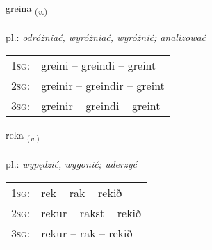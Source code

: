 \documentclass[frontgrid, backgrid]{flacards}\usepackage[]{graphicx}\usepackage[]{xcolor}
\begin{document}
\renewcommand{\blhead}{\vskip5pt {\small\bfseries\footnotesize Sagnorð | czasownik }}
\renewcommand{\bcfoot}{\vskip5pt \hspace{2pt}{\small\bfseries\footnotesize 1K}}


{greina \small{\textsubscript{(\textit{v.})}} \\[1ex] %
\textphonetic{[kreiːna]} \\
pl.: \emph{odróżniać, wyróżniać, wyróżnić; analizować} \\  [2ex]
\renewcommand*{\arraystretch}{0.8}
\begin{tabular}{p{1cm}l}
\textsc{1sg}: & greini -- greindi -- greint \\ 
\textsc{2sg}: & greinir -- greindir -- greint \\ 
\textsc{3sg}: & greinir -- greindi -- greint \\ 
\end{tabular}
}

\renewcommand{\flhead}{\vskip5pt \fboxsep=0pt {\small\bfseries\footnotesize Sagnorð | czasownik}}
\renewcommand{\fcfoot}{\vskip5pt \fboxsep=0pt \hspace{2pt}{\small\bfseries\footnotesize 1K}}

\renewcommand{\blhead}{\vskip5pt {\small\bfseries\footnotesize Sagnorð | czasownik }}
\renewcommand{\bcfoot}{\vskip5pt \hspace{2pt}{\small\bfseries\footnotesize 1K}}


{reka \small{\textsubscript{(\textit{v.})}} \\[1ex] %
\textphonetic{[rɛːka]} \\
pl.: \emph{wypędzić, wygonić; uderzyć} \\  [2ex]
\renewcommand*{\arraystretch}{0.8}
\begin{tabular}{p{1cm}l}
\textsc{1sg}: & rek -- rak -- rekið \\ 
\textsc{2sg}: & rekur -- rakst -- rekið \\ 
\textsc{3sg}: & rekur -- rak -- rekið \\ 
\end{tabular}
}
\end{document}
